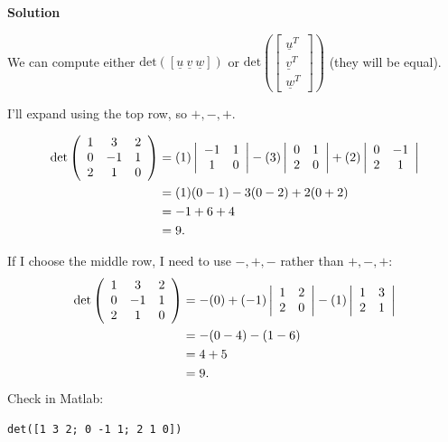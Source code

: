 \documentclass[12pt,letterpaper,noanswers]{exam}
\newcommand{\mb}[1]{\underline{#1}}
\begin{document}
\noindent\textbf{Solution}

We can compute either $\text{det}\left([\mb{u}\ \mb{v}\ \mb{w} ]\right)$ or $\text{det}\left(\left[\begin{array}{c}\mb{u}^T \\ \mb{v}^T \\ \mb{w}^T \end{array}\right]\right)$ (they will be equal).


I'll expand using the top row, so $+,-,+$.

\begin{align*}
    \text{det}\left(\begin{array}{c c c}1 & 3 & 2 \\ 0 & -1 & 1 \\ 2 & 1 & 0 \end{array}\right) &= (1) \left\vert \begin{array}{c c} -1 & 1 \\ 1 & 0\end{array}\right\vert- (3) \left\vert \begin{array}{c c} 0 & 1 \\ 2 & 0\end{array} \right\vert + (2) \left\vert \begin{array}{c c}0 & -1 \\ 2 & 1\end{array} \right\vert \\
    &= (1)(0-1) -3(0-2) +2(0+2) \\
    &= -1 +6 + 4\\
    &= 9.
\end{align*}

If I choose the middle row, I need to use $-,+,-$ rather than $+,-,+$:
\begin{align*}
\text{det}\left(\begin{array}{c c c}1 & 3 & 2 \\ 0 & -1 & 1 \\ 2 & 1 & 0 \end{array}\right) &= -(0) + (-1) \left\vert \begin{array}{c c} 1 & 2 \\ 2 & 0\end{array} \right\vert - (1) \left\vert \begin{array}{c c}1 & 3 \\ 2 & 1\end{array} \right\vert \\
    &=  -(0-4) -(1-6) \\
    &= 4 +5\\
    &= 9.
\end{align*}
Check in Matlab:
\begin{lstlisting}
det([1 3 2; 0 -1 1; 2 1 0])
\end{lstlisting}
\end{document}
